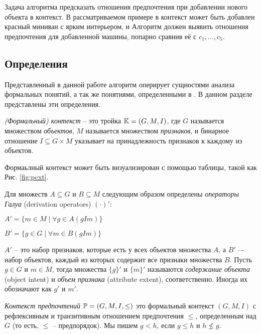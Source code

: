 		Задача алгоритма предсказать отношения предпочтения при добавлении нового объекта в контекст. В рассматриваемом примере в контекст может быть добавлен красный миниван с ярким интерьером, и Алгоритм должен выявить отношения предпочтения для добавленной машины, попарно сравнив её с $c_1, \dots, c_5$. 
	
	\subsection{Определения}
	\label{subsection:definitions}
		Представленный в данной работе алгоритм оперирует сущностями анализа формальных понятий\cite{Ganter:1999}, а так же понятиями, определенными в \cite{Obiedkov:2012:preferences,Obiedkov:2012:modeling}. В данном разделе представлены эти определения.
		
		
		\begin{definition}
			\emph{(Формальный) контекст} – это тройка $\mathbb{K} = (G, M, I)$, где $G$ называется множеством \emph{объектов}, $M$ называется множеством \emph{признаков}, и бинарное отношение ${I \subseteq G \times M}$ указывает на принадлежность признаков к каждому из объектов.
		\end{definition}
		
		Формаьлный контекст может быть визуализирован с помощью таблицы, такой как Рис. \ref{fig:pcxt}.
		
		Для множеств $A \subseteq G$ и $B \subseteq M$ следующим образом определены \emph{операторы Галуа} (derivation operators) $(\cdot)'$:
		\begin{center}
			$A'=\{m \in M \mid \forall g \in A (g I m)\}$
			
			$B'=\{g \in G \mid \forall m \in B (g I m)\}$
		\end{center}
		$A'$ – это набор признаков, которые есть у всех объектов множества $A$, а $B'$  –- набор объектов, каждый из которых содержит все признаки множества $B$. Пусть $g \in G$ и $m \in M$, тогда множества $\{g\}'$ и $\{m\}'$ называются \emph{содержание объекта} (object intent) и \emph{объем признака} (attribute extent), соответственно. Иногда их обозначают как $g'$ и $m'$.
		
		\begin{definition}
			\emph{Контекст предпочтений} $\mathbb{P} = (G, M, I, \leq)$ это формальный контекст $(G, M, I)$ с рефлексивным и транзитивным отношением предпочтения $\leq$, определенным над $G$ (то есть, $\leq$ – предпорядок). Мы пишем $g < h$, если $g \leq h$ и $h \not\leq g$.
		\end{definition}
		
